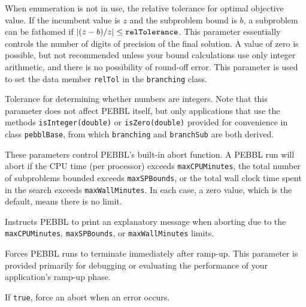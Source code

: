 When enumeration is not in use, the 
relative tolerance for optimal objective value.  If the incumbent
value is $z$ and the subproblem bound is $b$, a subproblem can be
fathomed if ${\left|(z - b)/z\right|} \leq
\text{\texttt{relTolerance}}$.  This parameter essentially controls the
number of digits of precision of the final solution.  A
value of zero is possible, but not recommended unless your bound
calculations use only integer arithmetic, and there is no possibility
of round-off error.  This parameter is used to set the data member
\texttt{relTol} in the \texttt{branching} class.

Tolerance for determining whether numbers are integers.  Note that
this parameter does not affect PEBBL itself, but only applications that
use the methods \texttt{isInteger(double)} or
\texttt{isZero(double)} provided for convenience in class
\texttt{pebblBase}, from which \texttt{branching} and
\texttt{branchSub} are both derived.

\groupparams
{}
\groupparams
{}
These parameters control PEBBL's built-in abort function.  A PEBBL run
will abort if the CPU time (per processor) exceeds
\texttt{maxCPUMinutes}, the total number of subproblems bounded
exceeds \texttt{maxSPBounds}, or the total wall clock time spent in
the search exceeds \texttt{maxWallMinutes}.  In each case, a zero
value, which is the default, means there is no limit.

Instructs PEBBL to print an explanatory message when
aborting due to the \texttt{maxCPUMinutes}, \texttt{maxSPBounds}, or
\texttt{maxWallMinutes} limits.

Forces PEBBL runs to terminate immediately after ramp-up.  This
parameter is provided primarily for debugging or evaluating the
performance of your application's ramp-up phase.

If \texttt{true}, force an abort when an error occurs.


